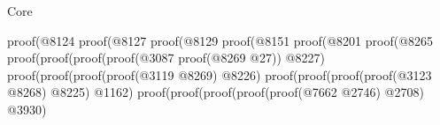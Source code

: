 \begin{lexlean}{Core}
\begin{coremodule}
                                                                                    proof(@8124
                                                                                        proof(@8127
                                                                                            proof(@8129
                                                                                                proof(@8151
                                                                                                    proof(@8201
                                                                                                        proof(@8265
                                                                                                            proof(proof(proof(proof(@3087
                                                                                                                      proof(@8269
                                                                                                                          @27))
                                                                                                                    @8227)
                                                                                                                  proof(proof(proof(proof(@3119
                                                                                                                            @8269)
                                                                                                                          @8226)
                                                                                                                        proof(proof(proof(proof(@3123
                                                                                                                                  @8268)
                                                                                                                                @8225)
                                                                                                                              @1162)
                                                                                                                            proof(proof(proof(proof(proof(@7662
                                                                                                                                        @2746)
                                                                                                                                      @2708)
                                                                                                                                    @3930)

\end{coremodule}
\end{lexlean}
